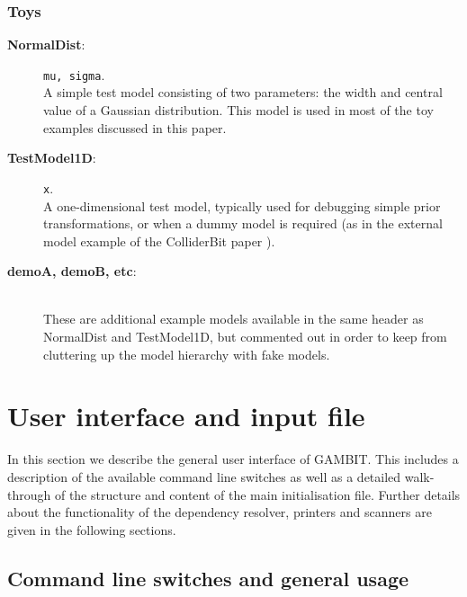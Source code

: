 \documentclass[pdftex,twocolumn,epjc3_preprint,runningheads]{svjour3}
\renewcommand{\_}{\discretionary{\underscore}{}{\underscore}}
\newcommand\term[1]{{\lstset{style=terminal}\lstinline!#1!\lstset{style=cpp}}}
\newcommand{\gsfitemc}[1]{\item[\textbf{\textsf{#1}}\label{#1}:]}
\newcommand{\gambit}{\textsf{GAMBIT}\xspace}
\newcommand{\colliderbit}{\textsf{ColliderBit}\xspace}
\newcommand{\GB}{\gambit}
\begin{document}
\subsubsection{Toys}

\begin{description}

\gsfitemc{NormalDist} \term{mu, sigma}.\\
A simple test model consisting of two parameters: the width and central value of a Gaussian distribution.  This model is used in most of the toy examples discussed in this paper.

\gsfitemc{TestModel1D} \term{x}.\\
A one-dimensional test model, typically used for debugging simple prior transformations, or when a dummy model is required (as in the external model example of the \colliderbit paper \cite{ColliderBit}).

\item[\textbf{\textsf{demo\_A}, \textsf{demo\_B}, etc\label{demos}}:] \hspace{2mm}\\
These are additional example models available in the same header as \textsf{NormalDist} and \textsf{TestModel1D}, but commented out in order to keep from cluttering up the model hierarchy with fake models.

\end{description}


\section{User interface and input file}
\label{interface}

In this section we describe the general user interface of \GB.  This includes a
description of the available command line switches as well as a detailed
walk-through of the structure and content of the main initialisation file.
Further details about the functionality of the
dependency resolver, printers and scanners are given in the following
sections.

\subsection{Command line switches and general usage}
\label{switches}
\end{document}
